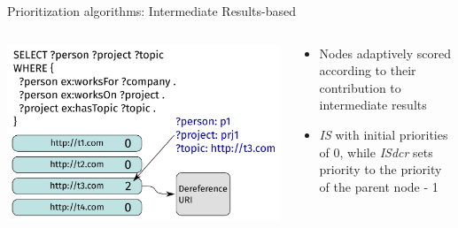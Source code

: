 \begin{frame}{Prioritization algorithms: Intermediate Results-based}
    \begin{columns}[T] %
        \begin{column}{0.6\textwidth} %
            \includegraphics[width=\linewidth]{images/intermediate-results-prioritization.pdf} %
        \end{column}

        \begin{column}{0.4\textwidth} %
            \begin{itemize}
                \item Nodes adaptively scored according to their contribution to intermediate results
                \item \emph{IS} with initial priorities of 0, while \emph{ISdcr} sets priority to the priority of the parent node - 1
            \end{itemize}
        \end{column}
    \end{columns}
\end{frame}





